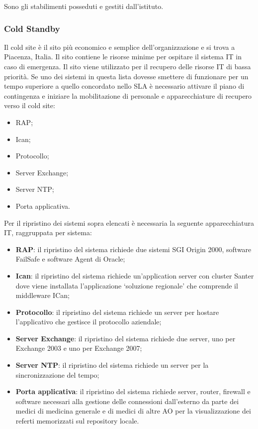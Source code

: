 \documentclass[12pt, a4paper, titlepage]{report}
\begin{document}
	Sono gli stabilimenti posseduti e gestiti dall'istituto.
	
	\subsubsection{Cold Standby} \label{cold}
	
	Il cold site è il sito più economico e semplice dell'organizzazione e si trova a Piacenza, Italia. Il sito contiene le risorse minime per ospitare il sistema IT in caso di emergenza. Il sito viene utilizzato per il recupero delle risorse IT di bassa priorità. Se uno dei sistemi in questa lista dovesse smettere di funzionare per un tempo superiore a quello concordato nello SLA è necessario attivare il piano di contingenza e iniziare la mobilitazione di personale e apparecchiature di recupero verso il cold site:
	\begin{itemize}
		\item RAP;
		\item Ican;
		\item Protocollo;
		\item Server Exchange;
		\item Server NTP;
		\item Porta applicativa.
	\end{itemize}
	Per il ripristino dei sistemi sopra elencati è necessaria la seguente apparecchiatura IT, raggruppata per sistema:
	\begin{itemize}
		\item \textbf{RAP}: il ripristino del sistema richiede due sistemi SGI Origin 2000, software FailSafe e software Agent di Oracle;
		\item \textbf{Ican}: il ripristino del sistema richiede un'application server con cluster Santer dove viene installata l'applicazione `soluzione regionale' che comprende il middleware ICan;
		\item \textbf{Protocollo}: il ripristino del sistema richiede un server per hostare l'applicativo che gestisce il protocollo aziendale;
		\item \textbf{Server Exchange}: il ripristino del sistema richiede due server, uno per Exchange 2003 e uno per Exchange 2007;
		\item \textbf{Server NTP}: il ripristino del sistema richiede un server per la sincronizzazione del tempo;
		\item \textbf{Porta applicativa}: il ripristino del sistema richiede server, router, firewall e software necessari alla gestione delle connessioni dall'esterno da parte dei medici di medicina generale e di medici di altre AO per la visualizzazione dei referti memorizzati sul repository locale.
	\end{itemize}
\end{document}
